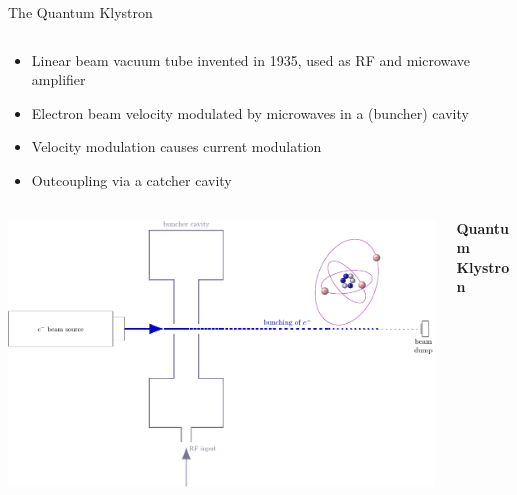 \documentclass[final]{beamer}
\begin{document}
\begin{frame}[fragile]{}
\begin{columns}[T]
\begin{column}{.49\linewidth}
\begin{block}{\Large The Quantum Klystron}
\begin{columns}
\begin{column}{0.55\columnwidth}
            \begin{itemize}
              \item Linear beam vacuum tube invented in 1935, used as RF and microwave amplifier
              \item Electron beam velocity modulated by microwaves in a (buncher) cavity
              \item Velocity modulation causes current modulation
              \item Outcoupling via a catcher cavity
            \end{itemize}
          \end{column}
        \end{columns}
        \begin{columns}
          \begin{column}{0.45\columnwidth}
            \includegraphics[width=\columnwidth]{figures/qklystron.pdf}
          \end{column}
          \begin{column}{0.55\columnwidth}
            \begin{center}
              {\large \textbf{Quantum Klystron}}
            \end{center}


\end{column}
\end{columns}
\end{block}
\end{column}
\end{columns}
\end{frame}
\end{document}
